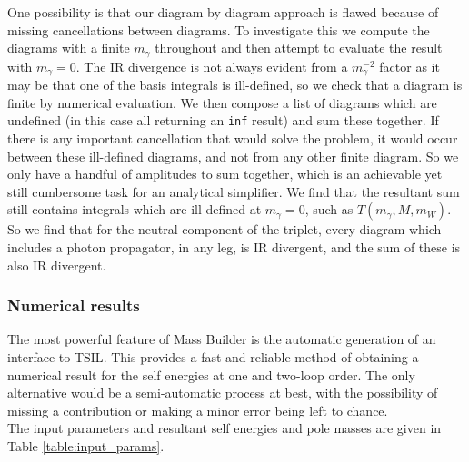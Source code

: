\documentclass[11pt]{article}
\newcommand{\mb}{\textsf{Mass Builder} }
\newcommand{\tsils}{\textsf{TSIL}}
\begin{document}
One possibility is that our diagram by diagram approach is flawed because of missing cancellations between diagrams.  To investigate this we compute the diagrams with a finite $m_{\gamma}$ throughout and then attempt to evaluate the result with $m_{\gamma}=0$.  The IR divergence is not always evident from a $m_{\gamma}^{-2}$ factor as it may be that one of the basis integrals is ill-defined, so we check that a diagram is finite by numerical evaluation.  We then compose a list of diagrams which are undefined (in this case all returning an \lstinline{inf} result) and sum these together.  If there is any important cancellation that would solve the problem, it would occur between these ill-defined diagrams, and not from any other finite diagram.  So we only have a handful of amplitudes to sum together, which is an achievable yet still cumbersome task for an analytical simplifier.  We find that the resultant sum still contains integrals which are ill-defined at $m_{\gamma}=0$, such as $T(m_{\gamma},M,m_W)$.\\

So we find that for the neutral component of the triplet, every diagram which includes a photon propagator, in any leg, is IR divergent, and the sum of these is also IR divergent.


\subsubsection{Numerical results}

The most powerful feature of \mb is the automatic generation of an interface to \tsils.  This provides a fast and reliable method of obtaining a numerical result for the self energies at one and two-loop order.  The only alternative would be a semi-automatic process at best, with the possibility of missing a contribution or making a minor error being left to chance.\\

The input parameters and resultant self energies and pole masses are given in Table \ref{table:input_params}.
\end{document}

